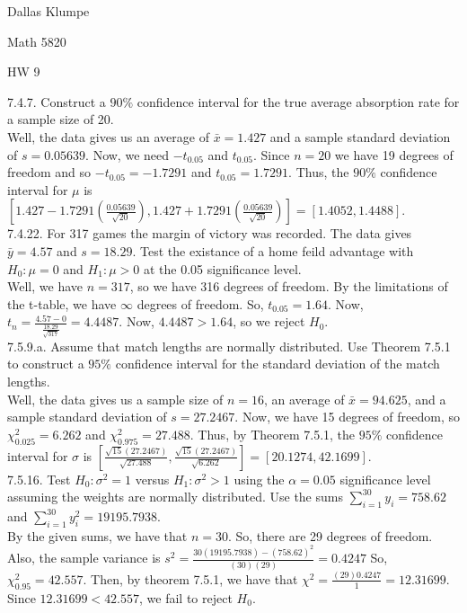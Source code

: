 \documentclass[12pt]{article}
\begin{document}
\noindent Dallas Klumpe

\noindent Math 5820

\noindent HW 9

7.4.7. Construct a $90\%$ confidence interval for the true average absorption rate for a sample size of 20.\\
Well, the data gives us an average of $\bar{x}=1.427$ and a sample standard deviation of $s=0.05639$. Now, we need $-t_{0.05}$ and $t_{0.05}$. Since $n=20$ we have 19 degrees of freedom and so $-t_{0.05}=-1.7291$ and $t_{0.05}=1.7291$. Thus, the $90\%$ confidence interval for $\mu$ is $[1.427-1.7291(\frac{0.05639}{\sqrt{20}}), 1.427+1.7291(\frac{0.05639}{\sqrt{20}})]=[1.4052, 1.4488]$.\\[20pt]

7.4.22. For 317 games the margin of victory was recorded. The data gives $\bar{y}=4.57$ and $s=18.29$. Test the existance of a home feild advantage with $H_0:\mu=0$ and $H_1:\mu>0$ at the 0.05 significance level.\\
Well, we have $n=317$, so we have 316 degrees of freedom. By the limitations of the t-table, we have $\infty$ degrees of freedom. So, $t_{0.05}=1.64$. Now, $t_n=\frac{4.57-0}{\frac{18.29}{\sqrt{317}}}=4.4487$. Now, $4.4487>1.64$, so we reject $H_0$.\\[20pt]

7.5.9.a. Assume that match lengths are normally distributed. Use Theorem 7.5.1 to construct a $95\%$ confidence interval for the standard deviation of the match lengths.\\
Well, the data gives us a sample size of $n=16$, an average of $\bar{x}=94.625$, and a sample standard deviation of $s=27.2467$. Now, we have 15 degrees of freedom, so $\chi^2_{0.025}=6.262$ and $\chi^2_{0.975}=27.488$. Thus, by Theorem 7.5.1, the $95\%$ confidence interval for $\sigma$ is $[\frac{\sqrt{15}(27.2467)}{\sqrt{27.488}}, \frac{\sqrt{15}(27.2467)}{\sqrt{6.262}}]=[20.1274, 42.1699]$.\\[20pt]

7.5.16. Test $H_0:\sigma^2=1$ versus $H_1:\sigma^2>1$ using the $\alpha=0.05$ significance level assuming the weights are normally distributed. Use the sums $\sum_{i=1}^{30}y_i=758.62$ and $\sum_{i=1}^{30}y_i^2=19195.7938$.\\
By the given sums, we have that $n=30$. So, there are 29 degrees of freedom. Also, the sample variance is $s^2=\frac{30(19195.7938)-(758.62)^2}{(30)(29)}=0.4247$ So, $\chi^2_{0.95}=42.557$. Then, by theorem 7.5.1, we have that $\chi^2=\frac{(29)0.4247}{1}=12.31699$. Since $12.31699<42.557$, we fail to reject $H_0$.
\end{document}

